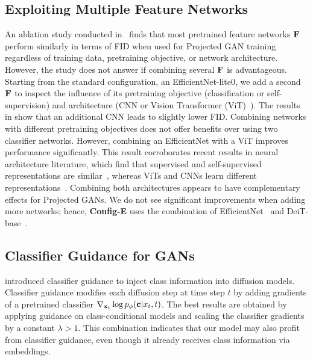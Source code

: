 \subsection{Exploiting Multiple Feature Networks}
An ablation study conducted in~\cite{Sauer2021NEURIPS} finds that most pretrained feature networks $\mathbf{F}$ perform similarly in terms of FID when used for Projected GAN training regardless of training data, pretraining objective, or network architecture. However, the study does not answer if combining several $\mathbf{F}$  is advantageous. Starting from the standard configuration, an EfficientNet-lite0, we add a second $\mathbf{F}$ to inspect the influence of its pretraining objective (classification or self-supervision) and architecture (CNN or Vision Transformer (ViT)~\cite{Dosovitskiy2021ICLR}). The results in  show that an additional CNN leads to slightly lower FID. Combining networks with different pretraining objectives does not offer benefits over using two classifier networks. However, combining an EfficientNet with a ViT improves performance significantly. This result corroborates recent results in neural architecture literature, which find that supervised and self-supervised representations are similar~\cite{Grigg2021ARXIV}, whereas ViTs and CNNs learn different representations~\cite{Raghu2021NEURIPS}. Combining both architectures appears to have complementary effects for Projected GANs. We do not see significant improvements when adding more networks; hence, \textbf{Config-E} uses the combination of EfficientNet~\cite{Tan2019ICML} and DeiT-base~\cite{Touvron2021ICML}.

\subsection{Classifier Guidance for GANs}
\cite{Dhariwal2021NEURIPS} introduced classifier guidance to inject class information into diffusion models. Classifier guidance modifies each diffusion step at time step $t$ by adding gradients of a pretrained classifier $\nabla_{\mathbf{x}_t}\log p_{\phi}(\mathbf{c}|x_t, t)$. The best results are obtained by applying guidance on class-conditional models and scaling the classifier gradients by a constant $\lambda>1$.  This combination indicates that our model may also profit from classifier guidance, even though it already receives class information via embeddings.

